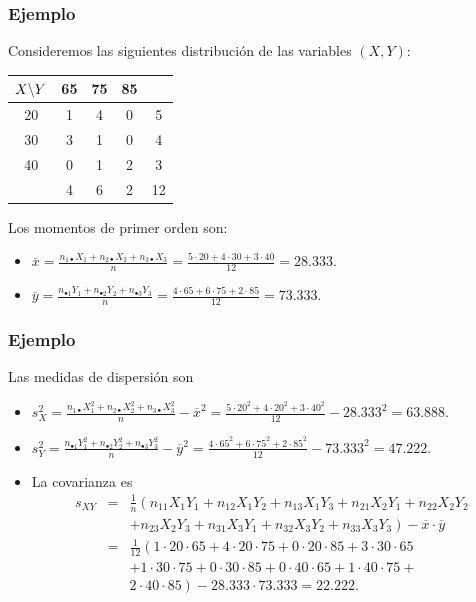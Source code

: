 \begin{frame}
\frametitle{Ejemplo}
Consideremos las siguientes distribución de las  variables $(X,Y)$: 
\begin{center}
\begin{tabular}{c|ccc|c}
$X  \mbox{\mbox{\textbackslash}}Y$ & 65 & 75 & 85 & \\ \hline 20 & 1 & 4 & 0 & 5 \\ 30 & 3 & 1 & 0 & 4 \\ 40 & 0 & 1 &
2 & 3 \\ \hline & 4 & 6 & 2 & 12
\end{tabular}
\end{center}

Los momentos de primer orden son:

\begin{itemize}
\item $\overline{x}=\frac{n_{1\bullet}X_1+n_{2\bullet}X_2+n_{3\bullet}X_3}{n}= \frac{5 \cdot 20
+ 4 \cdot 30 + 3 \cdot 40}{12}=28.333$.
\item $\overline{y}=\frac{n_{\bullet 1}Y_1+n_{\bullet 2}Y_2+n_{\bullet 3}Y_3}{n}= \frac{4 \cdot 65 + 6 \cdot 75 + 2 \cdot
85}{12}=73.333$.
\end{itemize}
\end{frame}

\begin{frame}
\frametitle{Ejemplo}
Las medidas de dispersión son 
\begin{itemize}
\item $s^2_X =\frac{n_{1\bullet}X^2_1+n_{2\bullet}X^2_2+n_{3\bullet}X^2_3}{n}- \overline{x}^2=
\frac{5 \cdot 20^2 + 4 \cdot 20^2 + 3 \cdot 40^2}{12}-28.333^2=63.888.$
\item $s^2_Y=\frac{n_{\bullet 1}Y^2_1+n_{\bullet 2}Y^2_2+n_{\bullet 3}Y^2_3}{n}-\overline{y}^2=
\frac{4 \cdot 65^2 + 6 \cdot 75^2 + 2 \cdot 85^2}{12}-73.333^2=47.222$. 
\item La covarianza es 
\begin{eqnarray*}
s_{XY}&=&\frac{1}{n} 
\left(
 n_{11} X_1 Y_1 + n_{12} X_1 Y_2 + n_{13} X_1 Y_3 + n_{21} X_2
Y_1 + n_{22} X_2 Y_2 
\right.\\
&&\left.
 + n_{23} X_2 Y_3 + n_{31} X_3 Y_1 + n_{32} X_3 Y_2 + n_{33} X_3 Y_3 \right) - \overline{x}\cdot\overline{y}
\\
&= &\frac{1}{12}
\left( 
1\cdot 20 \cdot 65 + 4\cdot 20 \cdot 75 + 0\cdot 20 \cdot 85 + 3\cdot 30 \cdot 65
\right.
\\
&&\left. + 1\cdot 30 \cdot 75 +0\cdot 30 \cdot 85+ 0\cdot 40 \cdot 65 + 1\cdot 40 \cdot 75 + \right.\\
&& \left. 2\cdot 40\cdot 85 
\right)-28.333\cdot 73.333 = 22.222.
\end{eqnarray*}
\end{itemize}
\end{frame}

